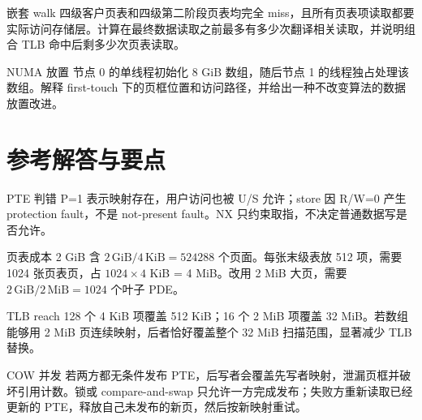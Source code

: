 \begin{chapterexercise}{嵌套 walk}
四级客户页表和四级第二阶段页表均完全 miss，且所有页表项读取都要实际访问存储层。计算在最终数据读取之前最多有多少次翻译相关读取，并说明组合 TLB 命中后剩多少次页表读取。
\end{chapterexercise}

\begin{chapterexercise}{NUMA 放置}
节点 0 的单线程初始化 8 GiB 数组，随后节点 1 的线程独占处理该数组。解释 first-touch 下的页框位置和访问路径，并给出一种不改变算法的数据放置改进。
\end{chapterexercise}

\section*{参考解答与要点}

\begin{chapteranswer}{PTE 判错}
P=1 表示映射存在，用户访问也被 U/S 允许；store 因 R/W=0 产生 protection fault，不是 not-present fault。NX 只约束取指，不决定普通数据写是否允许。
\end{chapteranswer}

\begin{chapteranswer}{页表成本}
2 GiB 含 $2\,\mathrm{GiB}/4\,\mathrm{KiB}=524288$ 个页面。每张末级表放 512 项，需要 1024 张页表页，占 $1024\times4$ KiB = 4 MiB。改用 2 MiB 大页，需要 $2\,\mathrm{GiB}/2\,\mathrm{MiB}=1024$ 个叶子 PDE。
\end{chapteranswer}

\begin{chapteranswer}{TLB reach}
128 个 4 KiB 项覆盖 512 KiB；16 个 2 MiB 项覆盖 32 MiB。若数组能够用 2 MiB 页连续映射，后者恰好覆盖整个 32 MiB 扫描范围，显著减少 TLB 替换。
\end{chapteranswer}

\begin{chapteranswer}{COW 并发}
若两方都无条件发布 PTE，后写者会覆盖先写者映射，泄漏页框并破坏引用计数。锁或 compare-and-swap 只允许一方完成发布；失败方重新读取已经更新的 PTE，释放自己未发布的新页，然后按新映射重试。
\end{chapteranswer}

